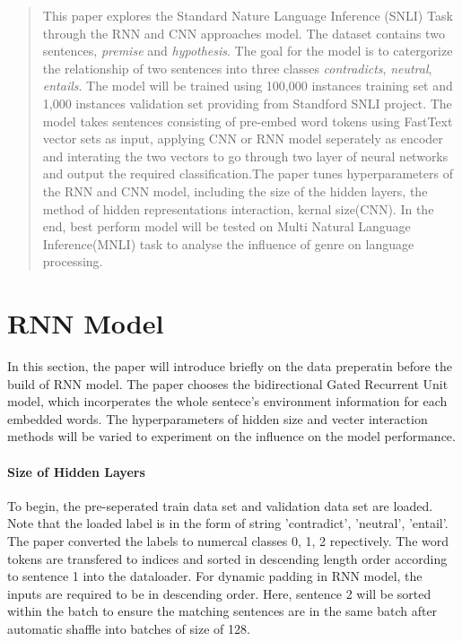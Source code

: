 \documentclass[10pt]{article}
\begin{document}
\maketitle

\begin{abstract}
This paper explores the Standard Nature Language Inference (SNLI) Task through the RNN and CNN approaches model. The dataset contains two sentences, \textit{premise} and \textit{hypothesis}. The goal for the model is to catergorize the relationship of two sentences into three classes \textit{contradicts}, \textit{neutral}, \textit{entails}. The model will be trained using 100,000 instances training set and 1,000 instances validation set providing from Standford SNLI project.
The model takes sentences consisting of pre-embed  word tokens using FastText vector sets as input, applying CNN or RNN model seperately as encoder and interating the two vectors to go through two layer of neural networks and output the required classification.The paper tunes hyperparameters of the RNN and CNN model, including the size of the hidden layers, the method of hidden representations interaction, kernal size(CNN).
In the end, best perform model will be tested on Multi Natural Language Inference(MNLI) task to analyse the influence of genre on language processing.
\end{abstract}

\section{RNN Model}
In this section, the paper will introduce briefly on the data preperatin before the build of RNN model. The paper chooses the bidirectional Gated Recurrent Unit model, which incorperates the whole sentece's environment information for each embedded words. The hyperparameters of hidden size and vecter interaction methods will be varied to experiment on the influence on the model performance. 


\paragraph{Size of Hidden Layers}
To begin, the pre-seperated train data set and validation data set are loaded. Note that the loaded label is in the form of string 'contradict', 'neutral', 'entail'. The paper converted the labels to numercal classes 0, 1, 2 repectively. The word tokens are transfered to indices and sorted in descending length order according to sentence 1 into the dataloader. For dynamic padding in RNN model, the inputs are required to be in descending order. Here, sentence 2 will be sorted within the batch to ensure the matching sentences are in the same batch after automatic shaffle into batches of size of 128.\par
\end{document}
